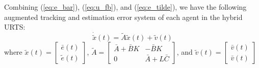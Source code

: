 \documentclass{ieeeaccess}
\begin{document}
Combining (\ref{eq:e_bar}), (\ref{eq:u_fb}), and (\ref{eq:e_tilde}), we have the following augmented tracking and estimation error system of each agent in the hybrid URTS:
\begin{equation} \label{eq:x_tilde}
    \dot{\tilde{x}}(t) = \tilde{A}\tilde{x}(t)+\tilde{v}(t)
\end{equation}
where $\tilde{x}(t)=\begin{bmatrix}
    \bar{e}(t) \\ \tilde{e}(t)
\end{bmatrix}$, $\tilde{A}=\begin{bmatrix}
    \bar{A}+\bar{B}K & -\bar{B}K \\ 0 & \bar{A}+L\bar{C}
\end{bmatrix}$, and $\tilde{v}(t)=\begin{bmatrix}
    \bar{v}(t) \\ \bar{v}(t)
\end{bmatrix}$
\end{document}
